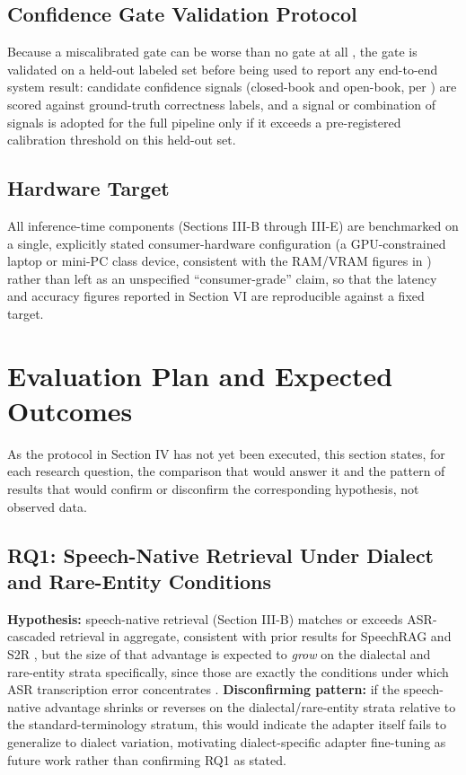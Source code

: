 \documentclass[conference]{IEEEtran}
\begin{document}
\subsection{Confidence Gate Validation Protocol}
Because a miscalibrated gate can be worse than no gate at all \cite{intrygue2026}, the gate is validated on a held-out labeled set before being used to report any end-to-end system result: candidate confidence signals (closed-book and open-book, per \cite{dependablerag2026}) are scored against ground-truth correctness labels, and a signal or combination of signals is adopted for the full pipeline only if it exceeds a pre-registered calibration threshold on this held-out set.

\subsection{Hardware Target}
All inference-time components (Sections III-B through III-E) are benchmarked on a single, explicitly stated consumer-hardware configuration (a GPU-constrained laptop or mini-PC class device, consistent with the RAM/VRAM figures in \cite{compactllm2026}) rather than left as an unspecified ``consumer-grade'' claim, so that the latency and accuracy figures reported in Section VI are reproducible against a fixed target.

\section{Evaluation Plan and Expected Outcomes}

As the protocol in Section IV has not yet been executed, this section states, for each research question, the comparison that would answer it and the pattern of results that would confirm or disconfirm the corresponding hypothesis, not observed data.

\subsection{RQ1: Speech-Native Retrieval Under Dialect and Rare-Entity Conditions}
\textbf{Hypothesis:} speech-native retrieval (Section III-B) matches or exceeds ASR-cascaded retrieval in aggregate, consistent with prior results for SpeechRAG and S2R \cite{min2025speechrag,google2025s2r}, but the size of that advantage is expected to \emph{grow} on the dialectal and rare-entity strata specifically, since those are exactly the conditions under which ASR transcription error concentrates \cite{benchmarkingasr2026,dialectmatters2026}. \textbf{Disconfirming pattern:} if the speech-native advantage shrinks or reverses on the dialectal/rare-entity strata relative to the standard-terminology stratum, this would indicate the adapter itself fails to generalize to dialect variation, motivating dialect-specific adapter fine-tuning as future work rather than confirming RQ1 as stated.
\end{document}
